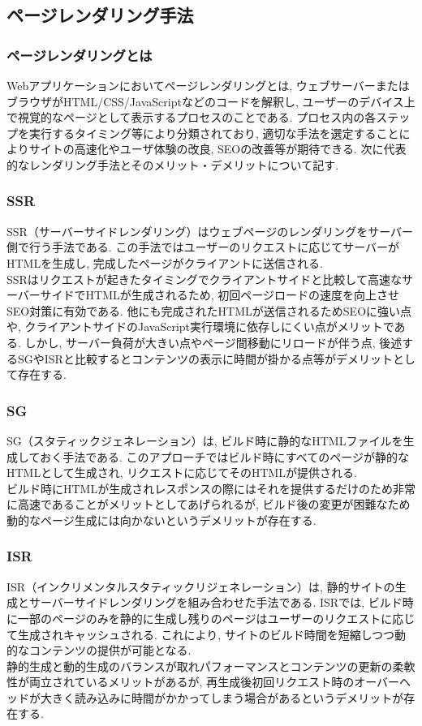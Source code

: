 \subsection{ページレンダリング手法}
\subsubsection{ページレンダリングとは}
Webアプリケーションにおいてページレンダリングとは, ウェブサーバーまたはブラウザがHTML/CSS/JavaScriptなどのコードを解釈し, ユーザーのデバイス上で視覚的なページとして表示するプロセスのことである.
プロセス内の各ステップを実行するタイミング等により分類されており, 適切な手法を選定することによりサイトの高速化やユーザ体験の改良, SEOの改善等が期待できる.
次に代表的なレンダリング手法とそのメリット・デメリットについて記す.

\subsubsection{SSR}
SSR（サーバーサイドレンダリング）はウェブページのレンダリングをサーバー側で行う手法である.
この手法ではユーザーのリクエストに応じてサーバーがHTMLを生成し, 完成したページがクライアントに送信される. \\
SSRはリクエストが起きたタイミングでクライアントサイドと比較して高速なサーバーサイドでHTMLが生成されるため, 初回ページロードの速度を向上させSEO対策に有効である.
他にも完成されたHTMLが送信されるためSEOに強い点や, クライアントサイドのJavaScript実行環境に依存しにくい点がメリットである.
しかし, サーバー負荷が大きい点やページ間移動にリロードが伴う点, 後述するSGやISRと比較するとコンテンツの表示に時間が掛かる点等がデメリットとして存在する.

\subsubsection{SG}
SG（スタティックジェネレーション）は, ビルド時に静的なHTMLファイルを生成しておく手法である.
このアプローチではビルド時にすべてのページが静的なHTMLとして生成され, リクエストに応じてそのHTMLが提供される.\\
ビルド時にHTMLが生成されレスポンスの際にはそれを提供するだけのため非常に高速であることがメリットとしてあげられるが, ビルド後の変更が困難なため動的なページ生成には向かないというデメリットが存在する.

\subsubsection{ISR}
ISR（インクリメンタルスタティックリジェネレーション）は, 静的サイトの生成とサーバーサイドレンダリングを組み合わせた手法である. 
ISRでは, ビルド時に一部のページのみを静的に生成し残りのページはユーザーのリクエストに応じて生成されキャッシュされる. 
これにより, サイトのビルド時間を短縮しつつ動的なコンテンツの提供が可能となる.\\
静的生成と動的生成のバランスが取れパフォーマンスとコンテンツの更新の柔軟性が両立されているメリットがあるが, 再生成後初回リクエスト時のオーバーヘッドが大きく読み込みに時間がかかってしまう場合があるというデメリットが存在する.

